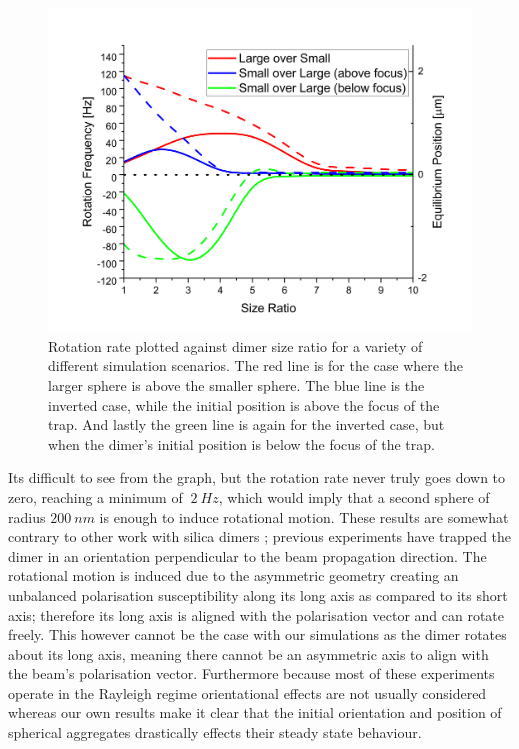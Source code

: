 \documentclass[a4paper,oneside,11pt]{book}
\begin{document}
\begin{figure}[h]
	\centering
	\includegraphics[width=0.65\linewidth]{figs/rotation_rate_vs_size.png}
	\caption{Rotation rate plotted against dimer size ratio for a variety of different simulation scenarios. The red line is for the case where the larger sphere is above the smaller sphere. The blue line is the inverted case, while the initial position is above the focus of the trap. And lastly the green line is again for the inverted case, but when the dimer's initial position is below the focus of the trap.}
\end{figure}

Its difficult to see from the graph, but the rotation rate never truly goes down to zero, reaching a minimum of $~2\ Hz$, which would imply that a second sphere of radius $200\ nm$ is enough to induce rotational motion. These results are somewhat contrary to other work with silica dimers \cite{Ahn2018, Debuysschere2023}; previous experiments have trapped the dimer in an orientation perpendicular to the beam propagation direction. The rotational motion is induced due to the asymmetric geometry creating an unbalanced polarisation susceptibility along its long axis as compared to its short axis; therefore its long axis is aligned with the polarisation vector and can rotate freely\cite{Ahn2018}. This however cannot be the case with our simulations as the dimer rotates about its long axis, meaning there cannot be an asymmetric axis to align with the beam's polarisation vector. Furthermore because most of these experiments operate in the Rayleigh regime orientational effects are not usually considered whereas our own results make it clear that the initial orientation and position of spherical aggregates drastically effects their steady state behaviour.

\newpage
\end{document}
